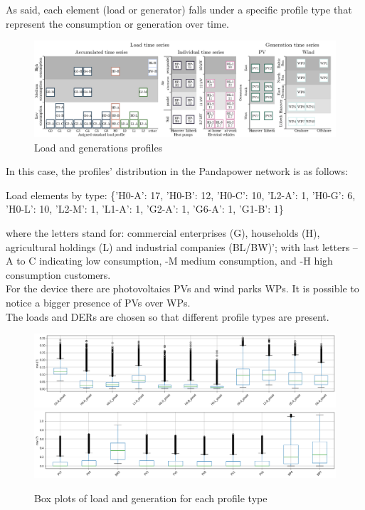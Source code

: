 As said, each element (load or generator) falls under a specific profile type that represent the consumption or generation over time.

\begin{figure}[H]
\centering
    \includegraphics[width=.8\linewidth]{images/MVOberr/SimBench load and generation time series.PNG}
\caption{Load and generations profiles}
\label{fig:gym_anm_net}
\end{figure}

In this case, the profiles' distribution in the Pandapower network is as follows:

\begin{algorithm}[h]
\State Load elements by type: \{'H0-A': 17, 'H0-B': 12, 'H0-C': 10, 'L2-A': 1, 'H0-G': 6, 'H0-L': 10, 'L2-M': 1, 'L1-A': 1, 'G2-A': 1, 'G6-A': 1, 'G1-B': 1\}

\end{algorithm}
\noindent where the letters stand for: commercial enterprises (G), households (H), agricultural holdings (L) and industrial companies (BL/BW)'; with last letters –A to C indicating low consumption, -M medium consumption, and -H high consumption customers. \\
For the  device there are photovoltaics \glspl{PV} and wind parks \glspl{WP}. It is possible to notice a bigger presence of \glspl{PV} over \glspl{WP}.\\

The loads and \glspl{DER} are chosen so that different profile types are present.



\begin{figure}[H]
\centering
    \includegraphics[width=.8\linewidth]{images/MVOberr/BoxPlotLoad.png}
    \includegraphics[width=.8\linewidth]{images/MVOberr/BoxPlotRes.png}
\caption{Box plots of load and generation for each profile type}
\label{fig:gym_anm_net}
\end{figure}

